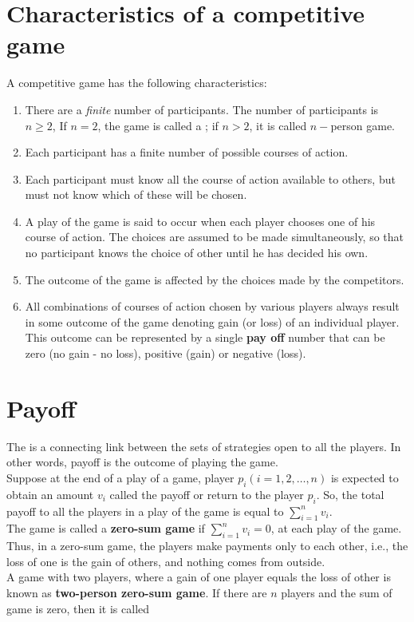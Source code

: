 \documentclass[../main-sheet.tex]{subfiles}
\begin{document}
\section{Characteristics of a competitive game}
A competitive game has the following characteristics:
\begin{enumerate}[label=(\roman*)]
    \item There are a \emph{finite} number of participants. The number of participants is \(n\geq 2\), If \(n=2\), the game is called a ; if \(n> 2\), it is called \(n-\)person game.
    \item Each participant has a finite number of possible courses of action.
    \item Each participant must know all the course of action available to others, but must not know which of these will be chosen.
    \item A play of the game is said to occur when each player chooses one of his course of action. The choices are assumed to be made simultaneously, so that no participant knows the choice of other until he has decided his own.
    \item The outcome of the game is affected by the choices made by the competitors.
    \item All combinations of courses of action chosen by various players always result in some outcome of the game denoting gain (or loss) of an individual player.\\
    This outcome can be represented by a single \textbf{pay off} number that can be zero (no gain - no loss), positive (gain) or negative (loss).
\end{enumerate}
\section{Payoff}
The  is a connecting link between the sets of strategies open to all the players. In other words, payoff is the outcome of playing the game.\\

Suppose at the end of a play of a game, player \(p_i (i=1,2,\dots, n)\) is expected to obtain an amount \(v_i\) called the payoff or return to the player \(p_i\). So, the total payoff to all the players in a play of the game is equal to \(\sum_{i=1}^n v_i\).\\

The game is called a \textbf{zero-sum game} if \(\sum_{i=1}^n v_i=0\), at each play of the game. Thus, in a zero-sum game, the players make payments only to each other, i.e., the loss of one is the gain of others, and nothing comes from outside.\\
A game with two players, where a gain of one player equals the loss of other is known as \textbf{two-person zero-sum game}. If there are \(n\) players and the sum of game is zero, then it is called 
\end{document}
